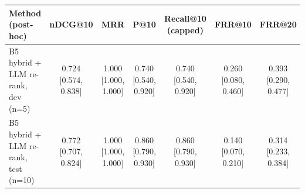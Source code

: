 \begin{tabular}{lcccccc}
\toprule
Method (post-hoc) & nDCG@10 & MRR & P@10 & Recall@10 (capped) & FRR@10 & FRR@20 \\
\midrule
B5 hybrid + LLM re-rank, dev (n=5) & 0.724 [0.574, 0.838] & 1.000 [1.000, 1.000] & 0.740 [0.540, 0.920] & 0.740 [0.540, 0.920] & 0.260 [0.080, 0.460] & 0.393 [0.290, 0.477] \\
B5 hybrid + LLM re-rank, test (n=10) & 0.772 [0.707, 0.824] & 1.000 [1.000, 1.000] & 0.860 [0.790, 0.930] & 0.860 [0.790, 0.930] & 0.140 [0.070, 0.210] & 0.314 [0.233, 0.384] \\
\bottomrule
\end{tabular}
